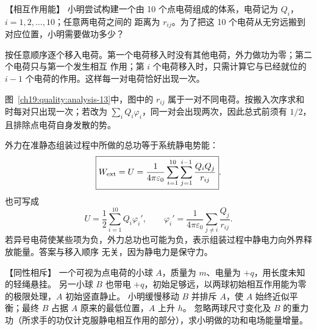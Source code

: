 \begin{origexamplebox}{【相互作用能】}\label{ch19:ex:s33-2-3}
小明尝试构建一个由 10 个点电荷组成的体系，电荷记为 $Q_i$，$i=1,2,\ldots,10$；任意两电荷之间的
距离为 $r_{ij}$。为了把这 10 个电荷从无穷远搬到对应位置，小明需要做功多少？

\ThQAssembly
\end{origexamplebox}\par\nopagebreak[4]

\begin{xesolution}
按任意顺序逐个移入电荷。第一个电荷移入时没有其他电荷，外力做功为零；第二个电荷只与第一个发生相互
作用；第 $i$ 个电荷移入时，只需计算它与已经就位的 $i-1$ 个电荷的作用。这样每一对电荷恰好出现一次。

\begin{qualityfigure}
\chargeAssemblyFigure
{}\label{ch19:quality:analysis-13}
\end{qualityfigure}
图~\ref{ch19:quality:analysis-13}中，图中的 $r_{ij}$ 属于一对不同电荷。按搬入次序求和时每对只出现一次；若改为 $\sum_iQ_i\varphi_i$，同一对会出现两次，因此总式前须有 $1/2$，且排除点电荷自身发散的势。

外力在准静态组装过程中所做的总功等于系统静电势能：
\[
  \boxed{W_{\rm ext}=U
  =\frac{1}{4\pi\varepsilon_0}
  \sum_{i=1}^{10}\sum_{j=1}^{i-1}\frac{Q_iQ_j}{r_{ij}}}.
\]
也可写成
\[
  \boxed{U=\frac12\sum_{i=1}^{10}Q_i\varphi_i'},
  \qquad
  \varphi_i'=\frac{1}{4\pi\varepsilon_0}
  \sum_{j\ne i}\frac{Q_j}{r_{ij}}.
\]
若异号电荷使某些项为负，外力总功也可能为负，表示组装过程中静电力向外界释放能量。答案与移入顺序
无关，因为静电力是保守力。
\end{xesolution}



\begin{origexamplebox}{【同性相斥】}\label{ch19:ex:s33-2-7}
一个可视为点电荷的小球 $A$，质量为 $m$、电量为 $+q$，用长度未知的轻绳悬挂。
另一小球 $B$ 也带电 $+q$，初始足够远，以两球初始相互作用能为零的极限处理，$A$ 初始竖直静止。
小明缓慢移动 $B$ 并排斥 $A$，使 $A$ 始终近似平衡；最终 $B$ 占据 $A$ 原来的最低位置，$A$ 上升 $h$。
忽略两球尺寸变化及 $B$ 的重力功（所求手的功仅计克服静电相互作用的部分），求小明做的功和电场能量增量。
\par\noindent\begin{minipage}{\linewidth}
\emRepellingQuestion
{}\label{ch19:fig:em-source-thirty-third-section-7}
\end{minipage}\par\medskip
\end{origexamplebox}\par\nopagebreak[4]

